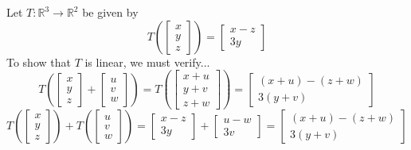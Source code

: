 \documentclass[10pt,]{book}
\theoremstyle{ptxplainnotitle}
\theoremstyle{ptxplaintitle}
\theoremstyle{ptxdefinitionnotitle}
\theoremstyle{ptxdefinitiontitle}
\theoremstyle{ptxdefinitionnotitle}
\theoremstyle{ptxdefinitiontitle}
\theoremstyle{ptxdefinitionnotitle}
\theoremstyle{ptxdefinitiontitle}
\theoremstyle{ptxdefinitionnotitle}
\theoremstyle{ptxdefinitiontitle}
\newcommand{\IR}{\mathbb{R}}
\begin{document}
\begin{example}\label{example-1}
\hypertarget{p-7}{}%
Let \(T : \IR^3 \rightarrow \IR^2\) be given by%
%
\begin{equation*}
T\left(\begin{bmatrix} x \\ y \\ z \end{bmatrix} \right)
=
\begin{bmatrix} x-z \\ 3y \end{bmatrix}
\end{equation*}
\hypertarget{p-8}{}%
To show that \(T\) is linear, we must verify...%
%
\begin{equation*}
T\left(
\begin{bmatrix} x \\ y \\ z \end{bmatrix} +
\begin{bmatrix} u \\ v \\ w \end{bmatrix}
\right)
=
T\left(
\begin{bmatrix} x+u \\ y+v \\ z+w \end{bmatrix}
\right) =
\begin{bmatrix} (x+u)-(z+w) \\ 3(y+v) \end{bmatrix}
\end{equation*}
%
\begin{equation*}
T\left(
\begin{bmatrix} x \\ y \\ z \end{bmatrix}
\right) + T\left(
\begin{bmatrix} u \\ v \\ w \end{bmatrix}
\right)
=
\begin{bmatrix} x-z \\ 3y \end{bmatrix} +
\begin{bmatrix} u-w \\ 3v \end{bmatrix}=
\begin{bmatrix} (x+u)-(z+w) \\ 3(y+v) \end{bmatrix}

\end{equation*}
\end{example}
\end{document}
